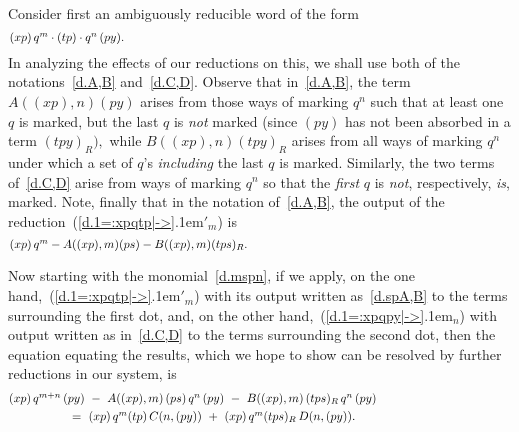 \documentclass{amsart}
\begin{document}
Consider first an ambiguously reducible word of the form
\begin{equation}\begin{minipage}[c]{35pc}\label{d.mspn}
$(xp)\,q^m\cdot(tp)\cdot q^n\,(py).$
\end{minipage}\end{equation}
In analyzing the effects of our reductions on this, we shall
use both of the notations~\eqref{d.A,B} and~\eqref{d.C,D}.
Observe that in~\eqref{d.A,B}, the term $A((xp),n)(py)$
arises from those ways of marking $q^n$ such that
at least one $q$ is marked, but the last $q$ is {\em not} marked
(since $(py)$ has not been absorbed in a term $(tpy)_R),$
while $B((xp),n)(tpy)_R$ arises from all ways of marking $q^n$
under which a set of $\!q\!$'s {\em including} the last $q$ is marked.
Similarly, the two terms of~\eqref{d.C,D} arise from ways of
marking $q^n$ so that the {\em first}
$q$ is {\em not}, respectively, {\em is}, marked.
Note, finally that in the notation of~\eqref{d.A,B}, the output of
the reduction~({{\setlength{\mathsurround}{0em}\ref{d.1=:xpqtp|->}\kern.1em$'_{{m}}$}}) is
\begin{equation}\begin{minipage}[c]{35pc}\label{d.spA,B}
$(xp)\,q^m - A((xp),m)(ps) - B((xp),m)(tps)_R.$
\end{minipage}\end{equation}

Now starting with the monomial~\eqref{d.mspn}, if we apply, on the one
hand,~({{\setlength{\mathsurround}{0em}\ref{d.1=:xpqtp|->}\kern.1em$'_{{m}}$}}) with its output written as~\eqref{d.spA,B}
to the terms surrounding the first dot, and, on the other
hand,~({{\setlength{\mathsurround}{0em}\ref{d.1=:xpqpy|->}\kern.1em$_{{n}}$}}) with output written as in~\eqref{d.C,D}
to the terms surrounding the second dot, then the equation equating the
results, which we hope to show can be resolved by further reductions
in our system, is
\begin{equation}\begin{minipage}[c]{35pc}\label{d.mspnABCD}
$(xp)\,q^{m+n}\,(py)\ -\ A((xp),m)\,(ps)\,q^n\,(py)\ -
\ B((xp),m)\,(tps)_R\,q^n\,(py)\\[.3em]
\hspace*{5em}=\ (xp)\,q^m (tp)\,C(n,(py))\ +
\ (xp)\,q^m (tps)_R\,D(n,(py)).$
\end{minipage}\end{equation}
\end{document}
